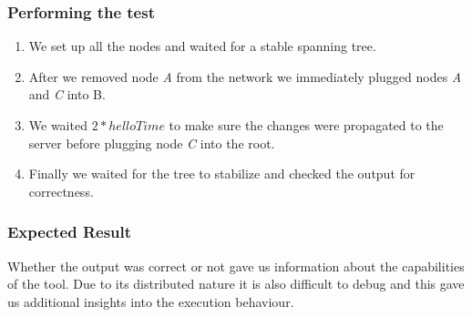 \subsubsection{Performing the test}
\begin{enumerate}
    \item We set up all the nodes and waited for a stable spanning tree.
    \item After we removed node \textit{A} from the network we immediately plugged nodes \textit{A} and \textit{C} into B.
    \item We waited $2*helloTime$ to make sure the changes were propagated to the server before plugging node \textit{C} into the root.
    \item Finally we waited for the tree to stabilize and checked the output for correctness.
\end{enumerate}

\subsubsection{Expected Result}
Whether the output was correct or not gave us information about the capabilities of the tool.
Due to its distributed nature it is also difficult to debug and this gave us additional insights into the execution behaviour.

